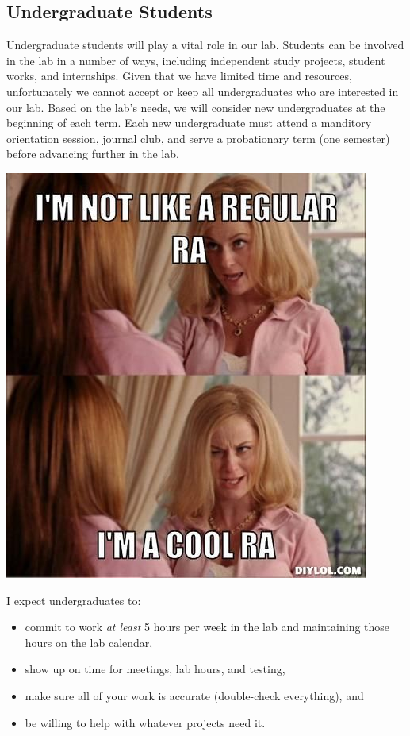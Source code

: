 \documentclass[]{book}
\providecommand{\tightlist}{%
  \setlength{\itemsep}{0pt}\setlength{\parskip}{0pt}}
\begin{document}
\hypertarget{undergraduate-students}{%
\subsection{Undergraduate Students}\label{undergraduate-students}}

Undergraduate students will play a vital role in our lab. Students can be involved in the lab in a number of ways, including independent study projects, student works, and internships. Given that we have limited time and resources, unfortunately we cannot accept or keep all undergraduates who are interested in our lab. Based on the lab's needs, we will consider new undergraduates at the beginning of each term. Each new undergraduate must attend a manditory orientation session, journal club, and serve a probationary term (one semester) before advancing further in the lab.

\includegraphics{images/RAmeme.jpg}

I expect undergraduates to:

\begin{itemize}
\tightlist
\item
  commit to work \emph{at least} 5 hours per week in the lab and maintaining those hours on the lab calendar,
\item
  show up on time for meetings, lab hours, and testing,\\
\item
  make sure all of your work is accurate (double-check everything), and
\item
  be willing to help with whatever projects need it.
\end{itemize}
\end{document}
